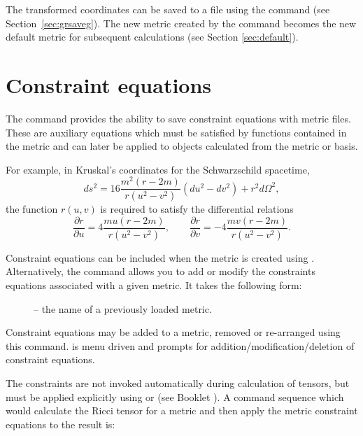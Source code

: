 \documentclass{article}
\begin{document}
The transformed coordinates can be saved to a file using the
 command (see Section~\ref{sec:grsaveg}). The new metric
created by the  command becomes the new default
metric for subsequent calculations (see Section \ref{sec:default}).
%
\section{Constraint equations} \label{sec:constraint}
%
The  command provides the ability to save constraint equations
with metric files. These are auxiliary equations which must be satisfied
by functions contained in the metric and can later be applied to objects
calculated from the metric or basis.

For example, in Kruskal's coordinates for the Schwarzschild spacetime,
\[
  ds^2 = 16 \frac{m^2(r-2m)}{r(u^2-v^2)}(du^2 - dv^2) + r^2 d\Omega^2,
\]
the function $r(u,v)$ is required to satisfy the differential relations
\[
  \frac{\partial r}{\partial u} = 4 \frac{m u (r-2m)}{r(u^2 - v^2)}, 
    \qquad
  \frac{\partial r}{\partial v} = -4\frac{m v (r-2m)}{r(u^2 - v^2)}.
\]

Constraint equations can be included when the metric is created using
. Alternatively, the command  allows you
to add or modify the constraints equations associated with a given metric.
It takes the following form:\\
%
\begin{cmdspec}
  \label{spec:grconstraint}

  \begin{description}
    \item[] -- the name of a previously loaded metric.
  \end{description}

\end{cmdspec}

Constraint equations may be added to a metric, removed or re-arranged 
using this command.  is menu driven and prompts for 
addition/modification/deletion of constraint equations.

The constraints are not invoked
automatically during calculation of tensors, but must be applied explicitly
using  or  (see Booklet \grCalcRef). A
command sequence which would calculate the Ricci tensor for a metric and
then apply the metric constraint equations to the result is:\\
\end{document}
